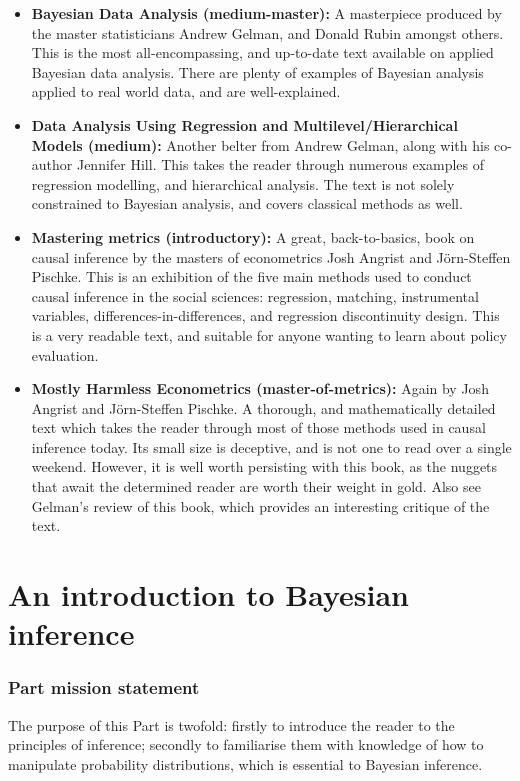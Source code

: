 \documentclass[11pt,fullpage]{book}
\begin{document}
\begin{itemize}
\item \textbf{Bayesian Data Analysis (medium-master): } A masterpiece produced by the master statisticians Andrew Gelman, and Donald Rubin amongst others. This is the most all-encompassing, and up-to-date text available on applied Bayesian data analysis. There are plenty of examples of Bayesian analysis applied to real world data, and are well-explained\cite{gelman2013bayesian}.
\item \textbf{Data Analysis Using Regression and Multilevel/Hierarchical Models (medium): } Another belter from Andrew Gelman, along with his co-author Jennifer Hill. This takes the reader through numerous examples of regression modelling, and hierarchical analysis. The text is not solely constrained to Bayesian analysis, and covers classical methods as well.
\item \textbf{Mastering metrics (introductory): } A great, back-to-basics, book on causal inference by the masters of econometrics Josh Angrist and Jörn-Steffen Pischke. This is an exhibition of the five main methods used to conduct causal inference in the social sciences: regression, matching, instrumental variables, differences-in-differences, and regression discontinuity design. This is a very readable text, and suitable for anyone wanting to learn about policy evaluation.
\item \textbf{Mostly Harmless Econometrics (master-of-metrics): } Again by Josh Angrist and Jörn-Steffen Pischke. A thorough, and mathematically detailed text which takes the reader through most of those methods used in causal inference today. Its small size is deceptive, and is not one to read over a single weekend. However, it is well worth persisting with this book, as the nuggets that await the determined reader are worth their weight in gold. Also see Gelman's review of this book, which provides an interesting critique of the text.
\end{itemize}

\part{An introduction to Bayesian inference}\label{part:BayesianInferenceIntro}
\section{Part mission statement}
The purpose of this Part is twofold: firstly to introduce the reader to the principles of inference; secondly to familiarise them with knowledge of how to manipulate probability distributions, which is essential to Bayesian inference.
\end{document}
